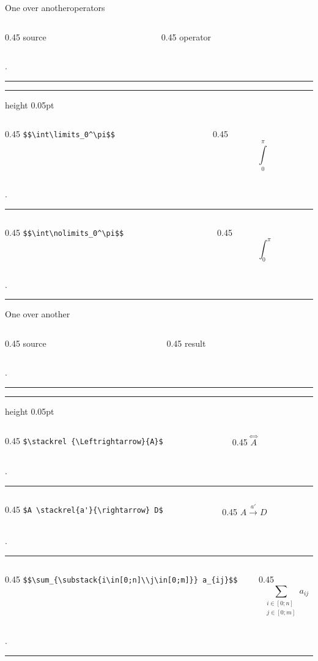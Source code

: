 \begin{frame}[fragile]{One over another\preMagicPage}{operators}\relax

\newcommand{\appendTline}[2]{\vspace*{10pt}\begin{columns}
        \begin{column}{0.45\textwidth}
          \hfill #1 
        \end{column}
        \begin{column}{0.45\textwidth}
             \hfill #2\hfill \hfill
        \end{column}
    \end{columns}
    \vphantom.
    \hrule
    }

    \cprotect[mm]\appendTline{\csk source}{\csk operator}
    \hrule height 0.05pt
    \cprotect[mm]\appendTline{\lstinline[basicstyle=\tt\normalsize,]|$$\int\limits_0^\pi$$|}{$$\int\limits_0^\pi$$}
    \cprotect[mm]\appendTline{\lstinline[basicstyle=\tt\normalsize,]|$$\int\nolimits_0^\pi$$|}{$$\int\nolimits_0^\pi$$}

\end{frame}

\begin{frame}[fragile]{One over another\magicPage}\relax

\newcommand{\appendTline}[2]{\vspace*{10pt}\begin{columns}
        \begin{column}{0.45\textwidth}
          \hfill #1 
        \end{column}
        \begin{column}{0.45\textwidth}
             \hfill #2\hfill \hfill
        \end{column}
    \end{columns}
    \vphantom.
    \hrule
    }

    \cprotect[mm]\appendTline{\csk source}{\csk result}
    \hrule height 0.05pt
    \cprotect[mm]\appendTline{\lstinline|$\stackrel {\Leftrightarrow}{A}$|}{$\stackrel {\Leftrightarrow}{A}$}
    \cprotect[mm]\appendTline{\lstinline|$A \stackrel{a'}{\rightarrow} D$|}{$A \stackrel{a'}{\rightarrow} D$}
    \cprotect[mm]\appendTline{\lstinline|$$\sum_{\substack{i\in[0;n]\\j\in[0;m]}} a_{ij}$$|}{$$\sum_{\substack{i\in[0;n]\\j\in[0;m]}} a_{ij}$$}
    
\end{frame}

